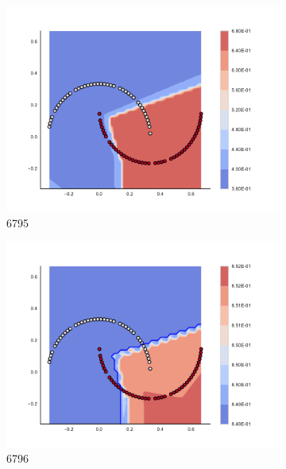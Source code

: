 \begin{figure}[h]
\begin{subfigure}[b]{0.09\textwidth}
    \includegraphics[clip, trim=2.35cm 1.75cm 4.5cm 0cm,width=\textwidth]{img/convergence/6795.pdf}
    \caption{6795}
    \label{fig:convergence_6795}
\end{subfigure}
%
\begin{subfigure}[b]{0.09\textwidth}
    \includegraphics[clip, trim=2.35cm 1.75cm 4.5cm 0cm,width=\textwidth]{img/convergence/6796.pdf}
    \caption{6796}
    \label{fig:convergence_6796}
\end{subfigure}
%
\begin{subfigure}[b]{0.09\textwidth}

\end{subfigure}
\end{figure}
